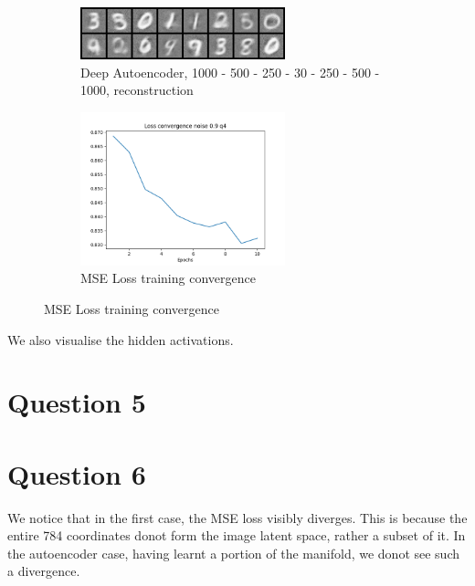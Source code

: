           \begin{figure}[!htbp]
          \begin{subfigure}
          \centering
          \includegraphics[angle=0,width=0.65\textwidth]{assign-4/logs/q4/deep_autoencoder_noise_0.9/image_5.png}
          \caption{Deep Autoencoder, 1000 - 500 - 250 - 30 - 250 - 500 - 1000, reconstruction}
          \end{subfigure}
          \begin{subfigure}
          \centering
          \includegraphics[angle=0,width=0.65\textwidth]{assign-4/logs/q4/convergence-noise-0.9.png}
          \caption{MSE Loss training convergence}
          \end{subfigure}
          \end{figure}
          
          
          We also visualise the hidden activations.

\section{Question 5}

\section{Question 6}

We notice that in the first case, the MSE loss visibly diverges. This is because the entire 784 coordinates donot form the image latent space, rather a subset of it. In the autoencoder case, having learnt a portion of the manifold, we donot see such a divergence.


